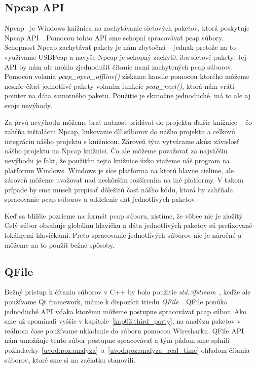 \subsection*{Npcap API}
Npcap~\cite{npcap} je Windows knižnica na zachytávanie sieťových paketov, ktorá poskytuje Npcap API~\cite{npcap_api}. Pomocou tohto API sme schopní spracovávať pcap súbory. Schopnosť Npcap zachytávať pakety je nám zbytočná -- jednak pretože na to využívame USBPcap a navyše Npcap je schopný zachytiť iba sieťové pakety. Jej API by nám ale mohlo zjednodušiť čítanie nami zachytených pcap súborov. Pomocou volania \textit{pcap\_open\_offline()} získame handle pomocou ktorého môžeme neskôr čítať jednotlivé pakety volaním funkcie \textit{pcap\_next()}, ktorá nám vráti pointer na dáta samotného paketu. Použitie je skutočne jednoduché, má to ale aj svoje nevýhody.

Za prvú nevýhodu môžeme brať nutnosť pridávať do projektu ďalšie knižnice -- čo zahŕňa inštaláciu Npcap, linkovanie dll súborov do nášho projektu a celkovú integráciu nášho projektu s knižnicou. Zároveň tým vytvárame akúsi závislosť nášho projektu na Npcap knižnici. Čo ale môžeme považovať za najväčšiu nevýhodu je fakt, že použitím tejto knižnice úzko viažeme náš program na platformu Windows. Windows je síce platforma na ktorú hlavne cielime, ale zároveň môžeme uvažovať nad neskôrším rozšírením na iné platformy. V takom prípade by sme museli prepísať dôležitú časť nášho kódu, ktorá by zahŕňala spracovanie pcap súborov a oddelenie dát jednotlivých paketov.

Keď sa bližšie pozrieme na formát pcap súboru, zistíme, že vôbec nie je zložitý. Celý súbor obsahuje globálnu hlavičku a dáta jednotlivých paketov sú prefixované lokálnymi hlavičkami. Preto spracovanie jednotlivých súborov nie je náročné a môžeme na to použiť bežné spôsoby.

\subsection*{QFile}
Bežný prístup k čítaniu súborov v C++ by bolo použitie \textit{std::ifstream}~\cite{std_ifstream}, keďže ale používame Qt framework, máme k dispozícii triedu \textit{QFile}~\cite{qfile}. QFile ponúka jednoduché API vďaka ktorému môžeme postupne spracovávať pcap súbor.
Ako sme už spomínali vyššie v kapitole~\ref{kap03:third_party}, na analýzu paketov v reálnom čase používame ukladanie do súboru pomocou Wiresharku. QFile API nám umožňuje tento súbor postupne spracovávať a tým pádom sme splnili požiadavky~\ref{uvod:poz:analyza}~a~\ref{uvod:poz:analyza_real_time} ohľadom čítania súborov, ktoré sme si na začiatku stanovili.

